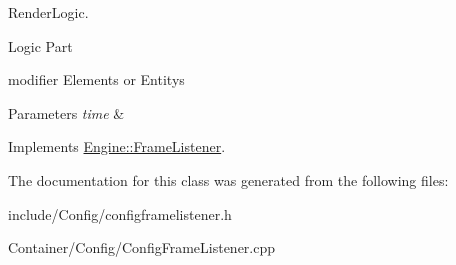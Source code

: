 Render\+Logic. 

Logic Part


\begin{DoxyItemize}
\item modifier Elements or Entitys
\end{DoxyItemize}


\begin{DoxyParams}{Parameters}
{\em time} & \\
\hline
\end{DoxyParams}


Implements \hyperlink{classEngine_1_1FrameListener_a3e111a872dd6592c14e11d3280ce14c4}{Engine\+::\+Frame\+Listener}.



The documentation for this class was generated from the following files\+:\begin{DoxyCompactItemize}
\item 
include/\+Config/configframelistener.\+h\item 
Container/\+Config/Config\+Frame\+Listener.\+cpp\end{DoxyCompactItemize}
